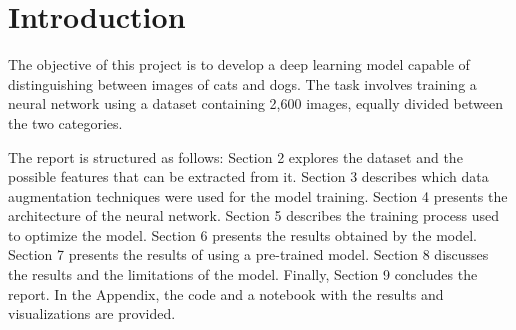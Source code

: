 \section{Introduction}
The objective of this project is to develop a deep learning model capable of distinguishing between images of cats and dogs. The task involves training a neural network using a dataset containing 2,600 images, equally divided between the two categories.

The report is structured as follows: Section 2 explores the dataset and the possible features that can be extracted from it. Section 3 describes which data augmentation techniques were used for the model training. Section 4 presents the architecture of the neural network. Section 5 describes the training process used to optimize the model. Section 6 presents the results obtained by the model. Section 7 presents the results of using a pre-trained model. Section 8 discusses the results and the limitations of the model. Finally, Section 9 concludes the report. In the Appendix, the code and a notebook with the results and visualizations are provided.